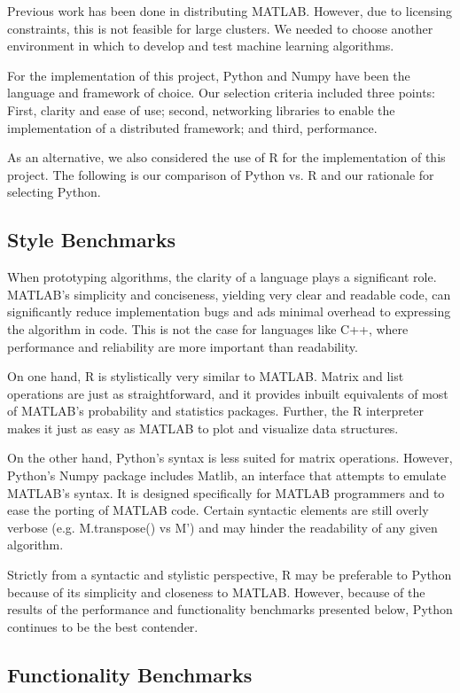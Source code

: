 \documentclass[%
  final,
  notitlepage,
  narroweqnarray,
  inline,
]{ieee}
\begin{document}
Previous work has been done in distributing MATLAB. However, due to licensing
constraints, this is not feasible for large clusters. We needed to choose
another environment in which to develop and test machine learning
algorithms.

For the implementation of this project, Python and Numpy have been the language
and framework of choice. Our selection criteria included three points: First,
clarity and ease of use; second, networking libraries to enable the
implementation of a distributed framework; and third, performance.

As an alternative, we also considered the use of R for the implementation of
this project. The following is our comparison of Python vs. R and our rationale
for selecting Python.

\subsection{Style Benchmarks}

When prototyping algorithms, the clarity of a language plays a significant role.
MATLAB's simplicity and conciseness, yielding very clear and readable code, can
significantly reduce implementation bugs and ads minimal overhead to expressing
the algorithm in code. This is not the case for languages like C++, where
performance and reliability are more important than readability.

On one hand, R is stylistically very similar to MATLAB. Matrix and list
operations are just as straightforward, and it provides inbuilt equivalents of
most of MATLAB's probability and statistics packages. Further, the R interpreter
makes it just as easy as MATLAB to plot and visualize data structures.

On the other hand, Python's syntax is less suited for matrix operations.
However, Python's Numpy package includes Matlib, an interface that attempts to
emulate MATLAB's syntax. It is designed specifically for MATLAB programmers and
to ease the porting of MATLAB code. Certain syntactic elements are still overly
verbose (e.g. M.transpose() vs M') and may hinder the readability of any given
algorithm.

Strictly from a syntactic and stylistic perspective, R may be preferable to
Python because of its simplicity and closeness to MATLAB. However, because
of the results of the performance and functionality benchmarks presented below,
Python continues to be the best contender.

\subsection{Functionality Benchmarks}
\end{document}
